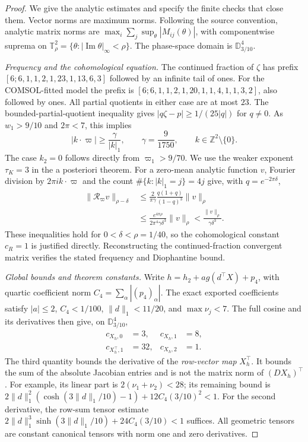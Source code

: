 \begin{proof}
We give the analytic estimates and specify the finite checks that close
them. Vector norms are maximum norms. Following the source convention,
analytic matrix norms are $\max_i\sum_j\sup_\theta|M_{ij}(\theta)|$,
with componentwise suprema on
$\mathbb T^2_\rho=\{\theta:|\operatorname{Im}\theta|_\infty<\rho\}$.
The phase-space domain is $\mathbb D_{3/10}^4$.

\emph{Frequency and the cohomological equation.}
The continued fraction of $\zeta$ has prefix
$[6;6,1,1,2,1,23,1,13,6,3]$ followed by an infinite tail of ones.
For the COMSOL-fitted model the prefix is
$[6;6,1,1,2,1,20,1,1,4,1,1,3,2]$, also followed by ones.
All partial quotients in either case are at most $23$.
The bounded-partial-quotient
inequality gives $|q\zeta-p|\geq1/(25|q|)$ for $q\ne0$.
As $w_1>9/10$ and $2\pi<7$, this implies
\begin{equation}
 |k\cdot\varpi|\geq\frac{\gamma}{|k|_1},\qquad
 \gamma=\frac9{1750},\qquad k\in\mathbb Z^2\setminus\{0\}.
 \label{eq:certified-dio}
\end{equation}
The case $k_2=0$ follows directly from $\varpi_1>9/70$.
We use the weaker exponent $\tau_K=3$ in the a posteriori theorem.
For a zero-mean analytic function $v$, Fourier division by
$2\pi i k\cdot\varpi$ and the count
$\#\{k:|k|_1=j\}=4j$ give, with $q=e^{-2\pi\delta}$,
\[
 \begin{aligned}
 \|\mathcal R_\varpi v\|_{\rho-\delta}
 &\leq\frac{2}{\pi\gamma}\frac{q(1+q)}{(1-q)^3}\|v\|_\rho\\
 &\leq\frac{e^{4\pi\rho}}{2\pi^4\gamma\delta^3}\|v\|_\rho
 <\frac{\|v\|_\rho}{\gamma\delta^3}.
 \end{aligned}
\]
These inequalities hold for $0<\delta<\rho=1/40$, so the
cohomological constant $c_R=1$ is justified directly.
Reconstructing the continued-fraction convergent matrix verifies the
stated frequency and Diophantine bound.

\emph{Global bounds and theorem constants.}
Write $h=h_2+a g(d^\top X)+p_4$, with quartic coefficient norm
$C_4=\sum_\alpha|(p_4)_\alpha|$.
The exact exported coefficients satisfy
$|a|\leq2$, $C_4<1/100$, $\|d\|_1<11/20$, and $\max\nu_j<7$.
The full cosine and its derivatives then give, on $\mathbb D_{3/10}^4$,
\begin{equation}
 \begin{aligned}
 c_{X_h,0}&=3,& c_{X_h,1}&=8,\\
 c_{X_h^\top,1}&=32,& c_{X_h,2}&=1.
 \end{aligned}
 \label{eq:HL-global-bounds}
\end{equation}
The third quantity bounds the derivative of the \emph{row-vector map}
$X_h^\top$. It bounds the sum of the absolute Jacobian entries and is
not the matrix norm of $(DX_h)^\top$.
For example, its linear part is $2(\nu_1+\nu_2)<28$; its remaining
bound is $2\|d\|_1^2(\cosh(3\|d\|_1/10)-1)+12C_4(3/10)^2<1$.
For the second derivative, the row-sum tensor estimate
$2\|d\|_1^3\sinh(3\|d\|_1/10)+24C_4(3/10)<1$ suffices.
All geometric tensors are constant canonical tensors with norm one
and zero derivatives.


\end{proof}
